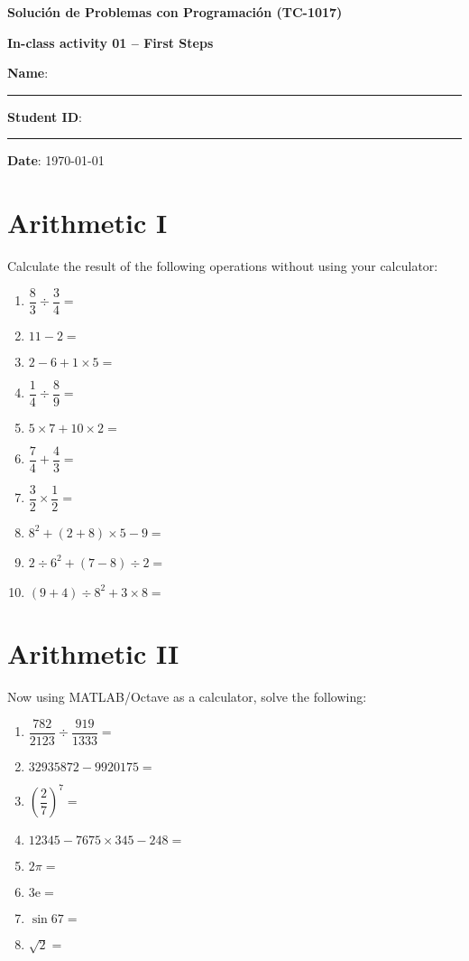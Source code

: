 \documentclass[spanish, 10pt]{article}
\begin{document}
\begin{center}
	{\Large \textbf{Solución de Problemas con Programación (TC-1017)}}
	
	\bigskip
	{\large \textbf{In-class activity 01 -- First Steps}}
\end{center}

\bigskip
{\large \textbf{Name}: \rule{14 cm}{0.4mm}}



\bigskip
{\large \textbf{Student ID}: \rule{5 cm}{0.4mm}} \hfill {\large \textbf{Date}: \today}

\section{Arithmetic I}

Calculate the result of the following operations without using your calculator:

\begin{enumerate}[label=\alph*)]
	\item $\dfrac{8}{3} \div \dfrac{3}{4} =$
	\item $11 - 2 =$
	\item $2 - 6 + 1 \times 5 =$
	\item $\dfrac{1}{4} \div \dfrac{8}{9} =$
	\item $5 \times 7 + 10 \times 2 =$
	\item $\dfrac{7}{4} + \dfrac{4}{3} =$
	\item $\dfrac{3}{2} \times \dfrac{1}{2} =$
	\item $8^ 2 + (2+8) \times 5 - 9 =$
	\item $2 \div 6^2 + (7-8) \div 2 =$
	\item $(9 + 4) \div 8^2 + 3 \times 8 =$
\end{enumerate}

\section{Arithmetic II}

Now using MATLAB/Octave as a calculator, solve the following:

\begin{enumerate}[label=\alph*)]
	\item $\dfrac{782}{2123} \div \dfrac{919}{1333} =$
	\item $32935872 - 9920175 =$
	\item $\left( \dfrac{2}{7} \right)^{7} =$
	\item $12345 - 7675 \times 345 - 248 =$
	\item $2 \pi =$
	\item $3 \mathrm{e} =$
	\item $\sin 67 =$
	\item $\sqrt{2} =$
\end{enumerate}
\end{document}
